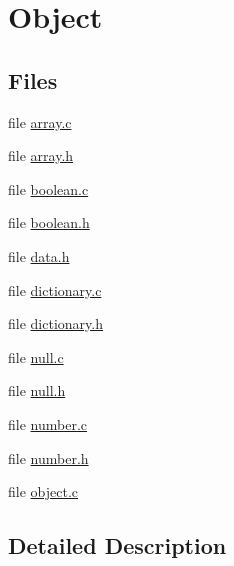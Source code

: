 \hypertarget{group__object}{\section{Object}
\label{group__object}
}
\subsection*{Files}
\begin{DoxyCompactItemize}
\item 
file \hyperlink{array_8c}{array.\-c}
\item 
file \hyperlink{array_8h}{array.\-h}
\item 
file \hyperlink{boolean_8c}{boolean.\-c}
\item 
file \hyperlink{boolean_8h}{boolean.\-h}
\item 
file \hyperlink{data_8h}{data.\-h}
\item 
file \hyperlink{dictionary_8c}{dictionary.\-c}
\item 
file \hyperlink{dictionary_8h}{dictionary.\-h}
\item 
file \hyperlink{null_8c}{null.\-c}
\item 
file \hyperlink{null_8h}{null.\-h}
\item 
file \hyperlink{number_8c}{number.\-c}
\item 
file \hyperlink{number_8h}{number.\-h}
\item 
file \hyperlink{object_8c}{object.\-c}
\end{DoxyCompactItemize}


\subsection{Detailed Description}
